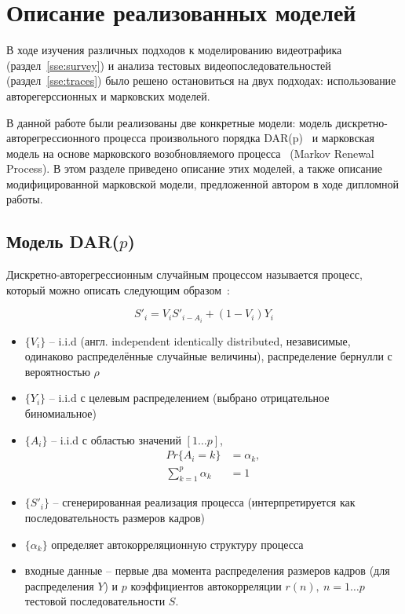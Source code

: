 \section{Описание реализованных моделей}
\label{sec:models_description}

В ходе изучения различных подходов к моделированию
видеотрафика (раздел~\ref{sse:survey}) и анализа
тестовых видеопоследовательностей (раздел~\ref{sse:traces})
было решено остановиться на двух подходах: использование
авторегерссионных и марковских моделей.

В данной работе были реализованы две конкретные модели:
модель дискретно-авторегрессионного процесса произвольного
порядка DAR(p)~\cite{heymanATM} и марковская модель на основе
марковского возобновляемого процесса~\cite{survey2013, heymanATM} (Markov Renewal Process).
В этом разделе приведено описание этих моделей, а также
описание модифицированной марковской модели, предложенной автором
в ходе дипломной работы.

\subsection{Модель DAR($p$)}
\label{sse:darp}

Дискретно-авторегрессионным случайным процессом называется
процесс, который можно описать следующим образом~\cite{survey2013}:

\begin{equation}
    S'_i = V_iS'_{i - A_i} + (1 - V_i) Y_i
    \label{eq:darp}
\end{equation}

\begin{itemize}
    \item $\{V_i\}$ -- i.i.d (англ. independent identically distributed, независимые, одинаково
        распределённые случайные величины), распределение бернулли с вероятностью $\rho$
    \item $\{Y_i\}$ -- i.i.d с целевым распределением (выбрано отрицательное биномиальное)
    \item $\{A_i\}$ -- i.i.d с областью значений $[1\dots p]$,
        $$
        \begin{aligned}
            Pr\{A_i = k\} &= \alpha_k,\\
            \sum_{k=1}^p \alpha_k &= 1
        \end{aligned}
        $$
    \item $\{S'_i\}$ -- сгенерированная реализация процесса (интерпретируется
        как последовательность размеров кадров)
    \item $\{\alpha_k\}$ определяет автокорреляционную структуру процесса
    \item входные данные -- первые два момента распределения размеров кадров
        (для распределения $Y$) и $p$ коэффициентов автокорреляции $r(n),~n=1\dots p$
        тестовой последовательности $S$.
\end{itemize}


